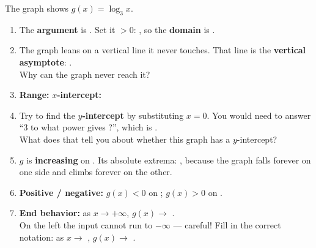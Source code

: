 \documentclass[10pt]{article}
\newcommand{\lgrid}[4]{%
  \draw[step=1, linegray!40, very thin] (#1,#3) grid (#2,#4);
  \draw[->, semithick, charcoal] (#1,0)--(#2,0) node[below right, font=\scriptsize]{$x$};
  \draw[->, semithick, charcoal] (0,#3)--(0,#4) node[left, font=\scriptsize]{$y$};}
\newcommand{\logcurve}[5]{\draw[very thick, forest, domain=#4:#5, samples=120, smooth]
  plot ({pow(#1,\x-(#3))+(#2)},{\x});}
\begin{document}
\begin{tcolorbox}[colback=white, colframe=black!40, title=\textbf{Tier R --- Remediate},
    fonttitle=\bfseries, arc=1.5mm, left=3mm, right=3mm, top=2mm, bottom=2mm, breakable]
The graph shows $g(x) = \log_3 x$.
\begin{center}
\end{center}
\begin{enumerate}[leftmargin=1.7em, itemsep=7pt]
  \item The \textbf{argument} is . Set it $>0$: , so the
        \textbf{domain} is .
  \item The graph leans on a vertical line it never touches. That line is the \textbf{vertical
        asymptote}: . \\
        Why can the graph never reach it? 
  \item \textbf{Range:} \ans{$(-\infty,\infty)$} \quad \textbf{$x$-intercept:} 
  \item Try to find the \textbf{$y$-intercept} by substituting $x=0$. You would need to answer
        ``$3$ to what power gives ?'', which is . \\
        What does that tell you about whether this graph has a $y$-intercept? 
  \item $g$ is \textbf{increasing} on . \quad Its absolute extrema:
        , because the graph falls forever on one side and climbs forever on the other.
  \item \textbf{Positive / negative:} $g(x)<0$ on ; \quad $g(x)>0$ on
        .
  \item \textbf{End behavior:} as $x\to+\infty$, $g(x)\to$ \ans{$+\infty$}. \\
        On the left the input cannot run to $-\infty$ --- careful! Fill in the correct notation:
        as $x\to$ , $g(x)\to$ \ans{$-\infty$}.
\end{enumerate}
\end{tcolorbox}
\end{document}
